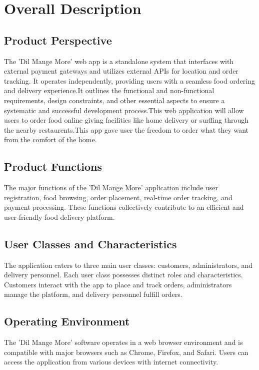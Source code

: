 \documentclass{article}
\begin{document}
\newpage
\section{Overall Description}
\subsection{Product Perspective}
The 'Dil Mange More' web app is a standalone system that interfaces with external payment gateways and utilizes external APIs for location and order tracking. It operates independently, providing users with a seamless food ordering and delivery experience.It outlines the functional and non-functional requirements, design constraints, and other essential aspects to ensure a systematic and successful development process.This web application will allow users to order food online giving facilities like home delivery or surffing through the nearby restaurents.This app gave user the freedom to order what they want from the comfort of the home.

\subsection{Product Functions}
The major functions of the 'Dil Mange More' application include user registration, food browsing, order placement, real-time order tracking, and payment processing. These functions collectively contribute to an efficient and user-friendly food delivery platform.

\subsection{User Classes and Characteristics}
The application caters to three main user classes: customers, administrators, and delivery personnel. Each user class possesses distinct roles and characteristics. Customers interact with the app to place and track orders, administrators manage the platform, and delivery personnel fulfill orders.

\subsection{Operating Environment}
The 'Dil Mange More' software operates in a web browser environment and is compatible with major browsers such as Chrome, Firefox, and Safari. Users can access the application from various devices with internet connectivity.
\end{document}
